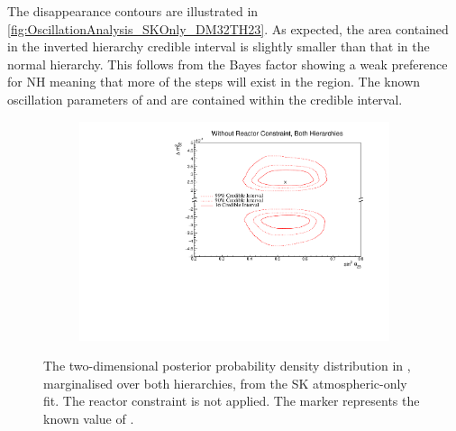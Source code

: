 The  disappearance contours are illustrated in \autoref{fig:OscillationAnalysis_SKOnly_DM32TH23}. As expected, the area contained in the inverted hierarchy \quickmath{1\sigma} credible interval is slightly smaller than that in the normal hierarchy. This follows from the Bayes factor showing a weak preference for NH meaning that more of the steps will exist in the  region. The known oscillation parameters of  and  are contained within the \quickmath{1\sigma} credible interval.

\begin{figure}[h]
  \begin{subfigure}[t]{0.98\textwidth}
    \includegraphics[width=\textwidth, trim={0mm 0mm 0mm 0mm}, clip,page=1]{Figures/OA/SKOnlyFit/Contours_2D_th23_dm32_BH_0_woRC_UnSmeared_CredibleInterval.pdf}
  \end{subfigure}
  \caption{The two-dimensional posterior probability density distribution in , marginalised over both hierarchies, from the SK atmospheric-only fit. The reactor constraint is not applied. The marker represents the known value of .}
  \label{fig:OscillationAnalysis_SKOnly_DM32TH23}
\end{figure}

